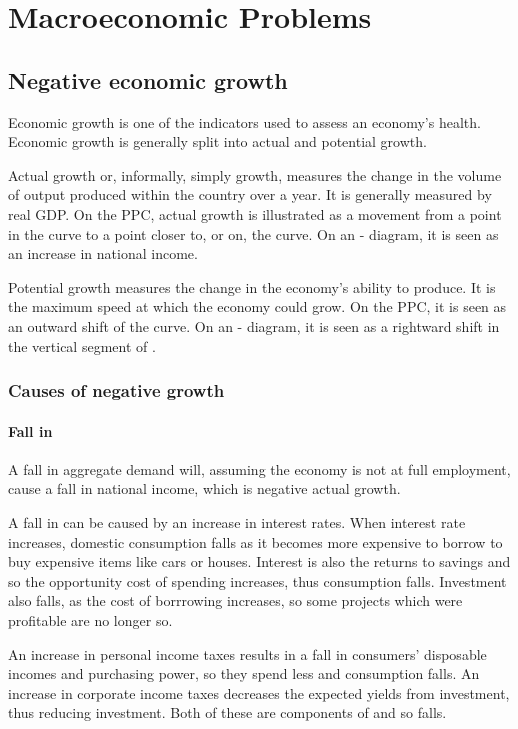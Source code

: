 \documentclass[Economics.tex]{subfiles}
\begin{document}
\chapter{Macroeconomic Problems}
\section{Negative economic growth}
Economic growth is one of the indicators used to assess an economy's health. Economic growth is generally split into actual and potential growth.

Actual growth or, informally, simply growth, measures the change in the volume of output produced within the country over a year. It is generally measured by real GDP. On the PPC, actual growth is illustrated as a movement from a point in the curve to a point closer to, or on, the curve. On an \AD{}-\AS{} diagram, it is seen as an increase in national income.

Potential growth measures the change in the economy's ability to produce. It is the maximum speed at which the economy could grow. On the PPC, it is seen as an outward shift of the curve. On an \AD{}-\AS{} diagram, it is seen as a rightward shift in the vertical segment of \AS{}.
\subsection{Causes of negative growth}
\subsubsection{Fall in \AD{}}
A fall in aggregate demand will, assuming the economy is not at full employment, cause a fall in national income, which is negative actual growth.

A fall in \AD{} can be caused by an increase in interest rates. When interest rate increases, domestic consumption falls as it becomes more expensive to borrow to buy expensive items like cars or houses. Interest is also the returns to savings and so the opportunity cost of spending increases, thus consumption falls. Investment also falls, as the cost of borrrowing increases, so some projects which were profitable are no longer so.

An increase in personal income taxes results in a fall in consumers' disposable incomes and purchasing power, so they spend less and consumption falls. An increase in corporate income taxes decreases the expected yields from investment, thus reducing investment. Both of these are components of \AD{} and so \AD{} falls.
\end{document}
